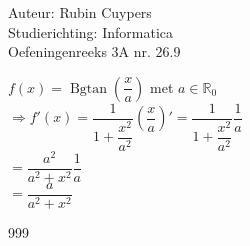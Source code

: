 \documentclass[a4paper]{article}
\newcommand{\Bgtan}{\operatorname{Bgtan}}
\begin{document}
  
\noindent \large Auteur: Rubin Cuypers \\
\noindent \large Studierichting: Informatica\\
\noindent \large Oefeningenreeks 3A nr. 26.9\\

\medskip

\normalsize

$f(x)=\Bgtan\left(\dfrac{x}{a}\right)$ met $ a \in \mathbb{R}_0$\\

$\Rightarrow f'(x)=\dfrac{1}{1+\dfrac{x^2}{a^2}} \left(\dfrac{x}{a}\right)'=\dfrac{1}{1+\dfrac{x^2}{a^2}}\dfrac{1}{a}$\\

$=\dfrac{a^2}{a^2+x^2}\dfrac{1}{a}$\\

$=\dfrac{a}{a^2+x^2}$\\


\begin{thebibliography}{999}
\end{thebibliography}
\end{document}
